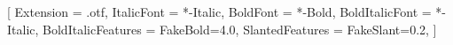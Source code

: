 \usepackage[margin=2.0cm,a5paper]{geometry}
\usepackage{fontspec}
\usepackage{graphicx}
\usepackage[greek,english,portuges]{babel}   %
\usepackage{indentfirst}

\setmainfont{QTPalatine}[
    Extension               = .otf,
    ItalicFont              = *-Italic,
    BoldFont                = *-Bold,
    BoldItalicFont          = *-Italic,
    BoldItalicFeatures      = {FakeBold=4.0},
    SlantedFeatures         = {FakeSlant=0.2},
]





